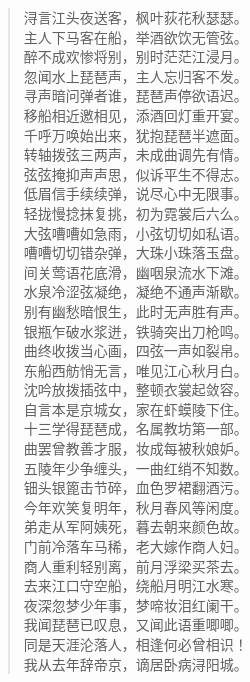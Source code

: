 \documentclass[12pt,oneside]{book}
\newenvironment{shici}{%
\begin{verse}\centering\yanti\large\hspace{12pt}}{\end{verse}}
\begin{document}
\begin{common-format}
\begin{shici}
浔言江头夜送客，枫叶荻花秋瑟瑟。\\
主人下马客在船，举酒欲饮无管弦。\\
醉不成欢惨将别，别时茫茫江浸月。\\
忽闻水上琵琶声，主人忘归客不发。\\
寻声暗问弹者谁，琵琶声停欲语迟。\\
移船相近邀相见，添酒回灯重开宴。\\
千呼万唤始出来，犹抱琵琶半遮面。\\
转轴拨弦三两声，未成曲调先有情。\\
弦弦掩抑声声思，似诉平生不得志。\\
低眉信手续续弹，说尽心中无限事。\\
轻拢慢捻抹复挑，初为霓裳后六么。\\
大弦嘈嘈如急雨，小弦切切如私语。\\
嘈嘈切切错杂弹，大珠小珠落玉盘。\\
间关莺语花底滑，幽咽泉流水下滩。\\
水泉冷涩弦凝绝，凝绝不通声渐歇。\\
别有幽愁暗恨生，此时无声胜有声。\\
银瓶乍破水浆迸，铁骑突出刀枪鸣。\\
曲终收拨当心画，四弦一声如裂帛。\\
东船西舫悄无言，唯见江心秋月白。\\
沈吟放拨插弦中，整顿衣裳起敛容。\\
自言本是京城女，家在虾蟆陵下住。\\
十三学得琵琶成，名属教坊第一部。\\
曲罢曾教善才服，妆成每被秋娘妒。\\
五陵年少争缠头，一曲红绡不知数。\\
钿头银篦击节碎，血色罗裙翻酒污。\\
今年欢笑复明年，秋月春风等闲度。\\
弟走从军阿姨死，暮去朝来颜色故。\\
门前冷落车马稀，老大嫁作商人妇。\\
商人重利轻别离，前月浮梁买茶去。\\
去来江口守空船，绕船月明江水寒。\\
夜深忽梦少年事，梦啼妆泪红阑干。\\
我闻琵琶已叹息，又闻此语重唧唧。\\
同是天涯沦落人，相逢何必曾相识！\\
我从去年辞帝京，谪居卧病浔阳城。\\

\end{shici}
\end{common-format}
\end{document}
